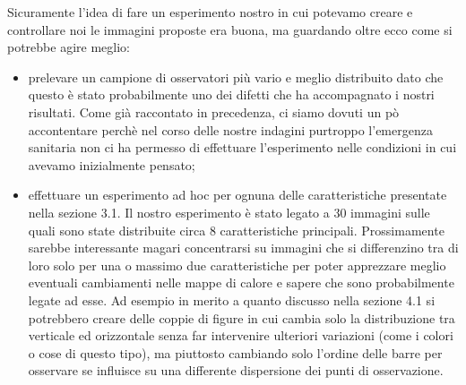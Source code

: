 \documentclass[%
	corpo=12pt,
    twoside,
    stile=classica,
    oldstyle,
    tipotesi=custom,
    greek,
    evenboxes,
]{toptesi}
\begin{document}
{Sicuramente l'idea di fare un esperimento nostro in cui potevamo creare e controllare noi le immagini proposte era buona, ma guardando oltre ecco come si potrebbe agire meglio:
\begin{itemize}
\item prelevare un campione di osservatori più vario e meglio distribuito dato che questo è stato probabilmente uno dei difetti che ha accompagnato i nostri risultati. Come già raccontato in precedenza, ci siamo dovuti un pò accontentare perchè nel corso delle nostre indagini purtroppo l'emergenza sanitaria non ci ha permesso di effettuare l'esperimento nelle condizioni in cui avevamo inizialmente pensato;
\item effettuare un esperimento ad hoc per ognuna delle caratteristiche presentate nella sezione 3.1. Il nostro esperimento è stato legato a 30 immagini sulle quali sono state distribuite circa 8 caratteristiche principali. Prossimamente sarebbe interessante magari concentrarsi su immagini che si differenzino tra di loro solo per una o massimo due caratteristiche per poter apprezzare meglio eventuali cambiamenti nelle mappe di calore e sapere che sono probabilmente legate ad esse. Ad esempio in merito a quanto discusso nella sezione 4.1 si potrebbero creare delle coppie di figure in cui cambia solo la distribuzione tra verticale ed orizzontale senza far intervenire ulteriori variazioni (come i colori o cose di questo tipo), ma piuttosto cambiando solo l'ordine delle barre per osservare se influisce su una differente dispersione dei punti di osservazione.
\end{itemize}

}
\end{document}
